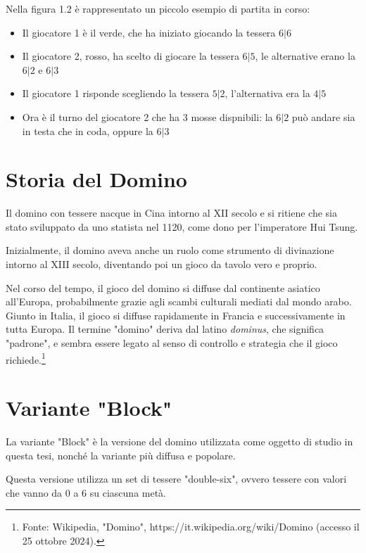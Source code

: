 \documentclass[a4paper,12pt]{report}
\begin{document}
Nella figura 1.2 è rappresentato un piccolo esempio di partita in corso:

\begin{itemize}
    \item Il giocatore 1 è il verde, che ha iniziato giocando la tessera \(6|6\)
    \item Il giocatore 2, rosso, ha scelto di giocare la tessera \(6|5\), le alternative erano la \(6|2\) e \(6|3\)
    \item Il giocatore 1 risponde scegliendo la tessera \(5|2\), l'alternativa era la \(4|5\)
        \item Ora è il turno del giocatore 2 che ha 3 mosse dispnibili: la \(6|2\) può andare sia in testa che in coda, oppure la \(6|3\)
\end{itemize}


\section{Storia del Domino}

Il domino con tessere nacque in Cina intorno al XII secolo e si ritiene che sia stato sviluppato da uno statista nel 1120, come dono per l'imperatore Hui Tsung. 

Inizialmente, il domino aveva anche un ruolo come strumento di divinazione intorno al XIII secolo, diventando poi un gioco da tavolo vero e proprio.

Nel corso del tempo, il gioco del domino si diffuse dal continente asiatico all'Europa, probabilmente grazie agli scambi culturali mediati dal mondo arabo. Giunto in Italia, il gioco si diffuse rapidamente in Francia e successivamente in tutta Europa. Il termine "domino" deriva dal latino \textit{dominus}, che significa "padrone", e sembra essere legato al senso di controllo e strategia che il gioco richiede.\footnote{Fonte: Wikipedia, "Domino", https://it.wikipedia.org/wiki/Domino (accesso il 25 ottobre 2024).}


\section{Variante "Block"}

La variante "Block" è la versione del domino utilizzata come oggetto di studio in questa tesi, nonché la variante più diffusa e popolare.

Questa versione utilizza un set di tessere "double-six", ovvero tessere con valori che vanno da 0 a 6 su ciascuna metà. 
\end{document}
